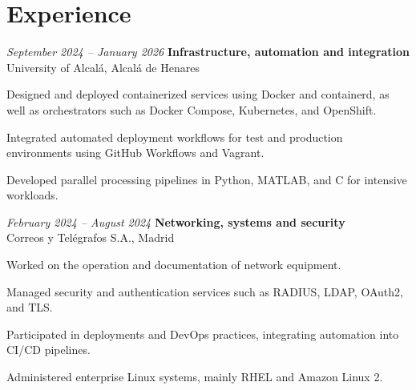 \vspace{-7pt}

\section{Experience}

\begin{twocolentry}{\textit{September 2024 – January 2026}}
	\textbf{Infrastructure, automation and integration} \\
	University of Alcalá, Alcalá de Henares
\end{twocolentry}
\begin{onecolentry}
	\begin{highlights}
		\item Designed and deployed containerized services using Docker and containerd, as well as orchestrators such as Docker Compose, Kubernetes, and OpenShift.
		\item Integrated automated deployment workflows for test and production environments using GitHub Workflows and Vagrant.
		\item Developed parallel processing pipelines in Python, MATLAB, and C for intensive workloads.
	\end{highlights}
\end{onecolentry}

\vspace{0.2 cm}

\begin{twocolentry}{\textit{February 2024 – August 2024}}
	\textbf{Networking, systems and security} \\
	Correos y Telégrafos S.A., Madrid
\end{twocolentry}
\begin{onecolentry}
	\begin{highlights}
		\item Worked on the operation and documentation of network equipment.
		\item Managed security and authentication services such as RADIUS, LDAP, OAuth2, and TLS.
		\item Participated in deployments and DevOps practices, integrating automation into CI/CD pipelines.
		\item Administered enterprise Linux systems, mainly RHEL and Amazon Linux 2.
	\end{highlights}
\end{onecolentry}

\vspace{0.2 cm}

